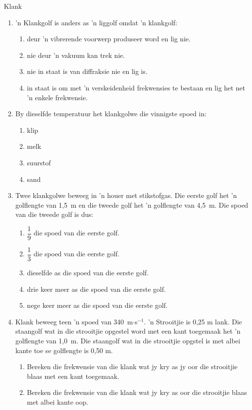 \begin{eocexercises}{Klank}
\begin{enumerate}[noitemsep, label=\textbf{\arabic*}. ]
\item 'n Klankgolf is anders as 'n liggolf omdat 'n klankgolf:
\begin{enumerate}[noitemsep, label=\textbf{\alph*}. ] 
    \item deur 'n vibrerende voorwerp produseer word en lig nie.
    \item nie deur 'n vakuum kan trek nie.
    \item nie in staat is van diffraksie nie en lig is.
    \item in staat is om met 'n verskeidenheid frekwensies te bestaan en lig het net 'n enkele frekwensie. 
\end{enumerate}

\item By dieselfde temperatuur het klankgolwe die vinnigste spoed in:
\begin{enumerate}[noitemsep, label=\textbf{\alph*}. ] 
    \item klip
    \item melk
    \item suurstof
    \item sand
\end{enumerate}
                
\item Twee klankgolwe beweeg in 'n houer met stikstofgas. Die eerste golf het 'n golflengte van 1,5~m en die tweede golf het 'n golflengte van 4,5~m. Die spoed van die tweede golf is dus:
\begin{enumerate}[itemsep=5pt, label=\textbf{\alph*}. ] 
    \item $\dfrac{1}{9}$ die spoed van die eerste golf.
    \item $\dfrac{1}{3}$ die spoed van die eerste golf.
    \item dieselfde as die spoed van die eerste golf.
    \item drie keer meer as die spoed van die eerste golf.
    \item nege keer meer as die spoed van die eerste golf.
\end{enumerate}


\item Klank beweeg teen 'n spoed van 340~m$\ensuremath{\cdot}$s${}^{-1}$. 'n Strooitjie is 0,25 m lank. Die staangolf wat in die strooitjie opgestel word met een kant toegemaak het 'n golflengte van 1,0~m. Die staangolf wat in die strooitjie opgstel is met albei kante toe se golflengte is 0,50 m.
\begin{enumerate}[noitemsep, label=\textbf{\alph*}. ] 
    \item Bereken die frekwensie van die klank wat jy kry as jy oor die strooitjie blaas met een kant toegemaak.
    \item Bereken die frekwensie van die klank wat jy kry as oor die strooitjie blaas met albei kante oop.
\end{enumerate}


\end{enumerate}
\end{eocexercises}
